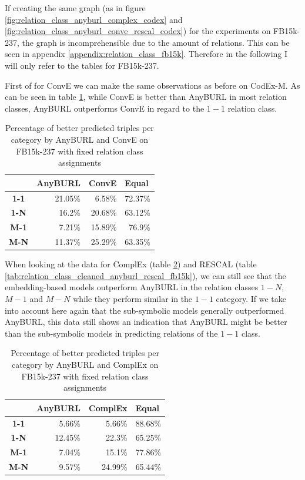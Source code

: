 If creating the same graph (as in figure \ref{fig:relation_class_anyburl_complex_codex} and \ref{fig:relation_class_anyburl_conve_rescal_codex}) for the experiments on FB15k-237, the graph is incomprehensible due to the amount of relations. This can be seen in appendix \ref{appendix:relation_class_fb15k}. Therefore in the following I will only refer to the tables for FB15k-237.

First of for ConvE we can make the same observations as before on CodEx-M. As can be seen in table \ref{tab:relation_class_cleaned_anyburl_conve_fb15k}, while ConvE is better than AnyBURL in most relation classes, AnyBURL outperforms ConvE in regard to the $1-1$ relation class. 

\begin{table}[H]
\centering
\begin{tabular}{c|rrr}
\multicolumn{1}{l|}{} & \multicolumn{1}{c}{\textbf{AnyBURL}} & \multicolumn{1}{c}{\textbf{ConvE}} & \multicolumn{1}{l}{\textbf{Equal}} \\ \hline
\textbf{1-1} & 21.05\% & 6.58\% & 72.37\% \\
\textbf{1-N} & 16.2\% & 20.68\% & 63.12\% \\
\textbf{M-1} & 7.21\% & 15.89\% & 76.9\% \\
\textbf{M-N} & 11.37\% & 25.29\% & 63.35\%
\end{tabular}
\caption{Percentage of better predicted triples per category by AnyBURL and ConvE on FB15k-237 with fixed relation class assignments}
\label{tab:relation_class_cleaned_anyburl_conve_fb15k}
\end{table}

When looking at the data for ComplEx (table \ref{tab:relation_class_cleaned_anyburl_complex_fb15k}) and RESCAL (table \ref{tab:relation_class_cleaned_anyburl_rescal_fb15k}), we can still see that the embedding-based models outperform AnyBURL in the relation classes $1-N$, $M-1$ and $M-N$ while they perform similar in the $1-1$ category. 
If we take into account here again that the sub-symbolic models generally outperformed AnyBURL, this data still shows an indication that AnyBURL might be better than the sub-symbolic models in predicting relations of the $1-1$ class. 

\begin{table}[H]
\centering
\begin{tabular}{c|rrr}
\multicolumn{1}{l|}{} & \multicolumn{1}{c}{\textbf{AnyBURL}} & \multicolumn{1}{c}{\textbf{ComplEx}} & \multicolumn{1}{l}{\textbf{Equal}} \\ \hline
\textbf{1-1} & 5.66\% & 5.66\% & 88.68\% \\
\textbf{1-N} & 12.45\% & 22.3\% & 65.25\% \\
\textbf{M-1} & 7.04\% & 15.1\% & 77.86\% \\
\textbf{M-N} & 9.57\% & 24.99\% & 65.44\%
\end{tabular}
\caption{Percentage of better predicted triples per category by AnyBURL and ComplEx on FB15k-237 with fixed relation class assignments}
\label{tab:relation_class_cleaned_anyburl_complex_fb15k}
\end{table}

